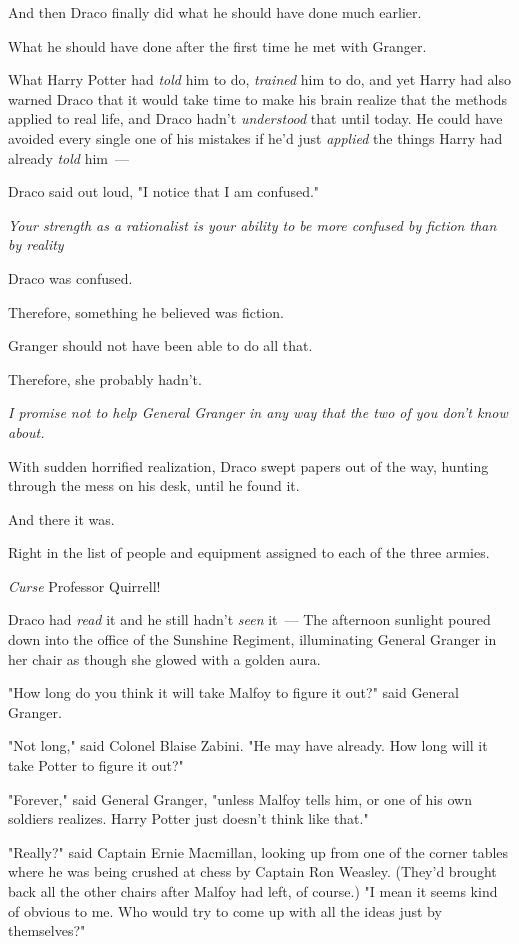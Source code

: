 And then Draco finally did what he should have done much earlier.

What he should have done after the first time he met with Granger.

What Harry Potter had \emph{told} him to do, \emph{trained} him to do, and yet
Harry had also warned Draco that it would take time to make his brain realize
that the methods applied to real life, and Draco hadn't \emph{understood} that
until today. He could have avoided every single one of his mistakes if he'd
just \emph{applied} the things Harry had already \emph{told} him~---

Draco said out loud, "I notice that I am confused."

\emph{Your strength as a rationalist is your ability to be more confused by
fiction than by reality{\el}}

Draco was confused.

Therefore, something he believed was fiction.

Granger should not have been able to do all that.

Therefore, she probably hadn't.

\emph{I promise not to help General Granger in any way that the two of you
don't know about.}

With sudden horrified realization, Draco swept papers out of the way, hunting
through the mess on his desk, until he found it.

And there it was.

Right in the list of people and equipment assigned to each of the three armies.

\emph{Curse} Professor Quirrell!

Draco had \emph{read} it and he still hadn't \emph{seen} it~---
\sbreak
The afternoon sunlight poured down into the office of the Sunshine Regiment,
illuminating General Granger in her chair as though she glowed with a golden
aura.

"How long do you think it will take Malfoy to figure it out?" said General
Granger.

"Not long," said Colonel Blaise Zabini. "He may have already. How long will it
take Potter to figure it out?"

"Forever," said General Granger, "unless Malfoy tells him, or one of his own
soldiers realizes. Harry Potter just doesn't think like that."

"Really?" said Captain Ernie Macmillan, looking up from one of the corner
tables where he was being crushed at chess by Captain Ron Weasley. (They'd
brought back all the other chairs after Malfoy had left, of course.) "I mean it
seems kind of obvious to me. Who would try to come up with all the ideas just
by themselves?"

